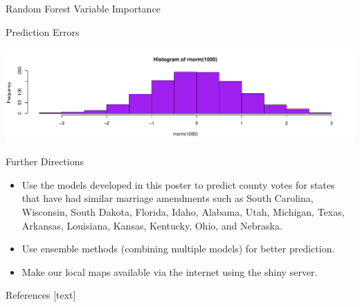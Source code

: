 \documentclass[final]{beamer}\usepackage[]{graphicx}\usepackage[]{color}
\makeatletter
\def\maxwidth{ %
  \ifdim\Gin@nat@width>\linewidth
    \linewidth
  \else
    \Gin@nat@width
  \fi
}
\newenvironment{knitrout}{}{} %
\makeatother
\begin{document}
\begin{frame}[fragile]
\begin{columns}[t]
\begin{column}{0.31\linewidth}
\begin{minipage}[t][.955\textheight]{\linewidth}
\begin{block}{Random Forest Variable Importance}
\begin{knitrout}
{}



\end{knitrout}
\vspace{0ex}
\vfill
\end{block}
\vfill

\begin{block}{Prediction Errors}
\begin{knitrout}
\color{fgcolor}

{\centering \includegraphics[width=\maxwidth]{figure/HIST3-1} 

}



\end{knitrout}
\vspace{0ex}
\vfill
\end{block}
\vfill

\begin{block}{Further Directions}
\begin{itemize}
\item Use the models developed in this poster to predict county votes for states that have had similar marriage amendments such as South Carolina, Wisconsin, South Dakota, Florida, Idaho, Alabama, Utah, Michigan, Texas, Arkansas, Louisiana, Kansas, Kentucky, Ohio, and Nebraska. 
\item  Use ensemble methods (combining multiple models) for better prediction.
\item  Make our local maps available via the internet using the shiny server.
\end{itemize}
\vspace{0ex}
\vfill
\end{block}
\vfill

\begin{block}{References}
\footnotesize
{}[text]
\vspace{-1ex}



\normalsize
\vfill
\end{block} 
\vfill

\end{minipage}
\end{column}%




\end{columns}
\end{frame}
\end{document}
